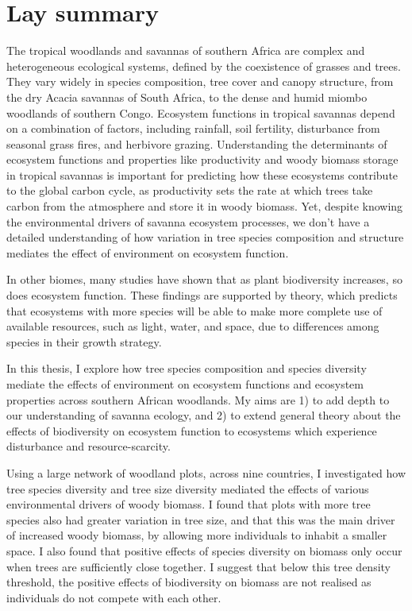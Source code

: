 \chapter*{Lay summary}
\label{lay}

The tropical woodlands and savannas of southern Africa are complex and heterogeneous ecological systems, defined by the coexistence of grasses and trees. They vary widely in species composition, tree cover and canopy structure, from the dry Acacia savannas of South Africa, to the dense and humid miombo woodlands of southern Congo. Ecosystem functions in tropical savannas depend on a combination of factors, including rainfall, soil fertility, disturbance from seasonal grass fires, and herbivore grazing. Understanding the determinants of ecosystem functions and properties like productivity and woody biomass storage in tropical savannas is important for predicting how these ecosystems contribute to the global carbon cycle, as productivity sets the rate at which trees take carbon from the atmosphere and store it in woody biomass. Yet, despite knowing the environmental drivers of savanna ecosystem processes, we don't have a detailed understanding of how variation in tree species composition and structure mediates the effect of environment on ecosystem function. 

In other biomes, many studies have shown that as plant biodiversity increases, so does ecosystem function. These findings are supported by theory, which predicts that ecosystems with more species will be able to make more complete use of available resources, such as light, water, and space, due to differences among species in their growth strategy. 

In this thesis, I explore how tree species composition and species diversity mediate the effects of environment on ecosystem functions and ecosystem properties across southern African woodlands. My aims are 1) to add depth to our understanding of savanna ecology, and 2) to extend general theory about the effects of biodiversity on ecosystem function to ecosystems which experience disturbance and resource-scarcity. 

Using a large network of woodland plots, across nine countries, I investigated how tree species diversity and tree size diversity mediated the effects of various environmental drivers of woody biomass. I found that plots with more tree species also had greater variation in tree size, and that this was the main driver of increased woody biomass, by allowing more individuals to inhabit a smaller space. I also found that positive effects of species diversity on biomass only occur when trees are sufficiently close together. I suggest that below this tree density threshold, the positive effects of biodiversity on biomass are not realised as individuals do not compete with each other.


